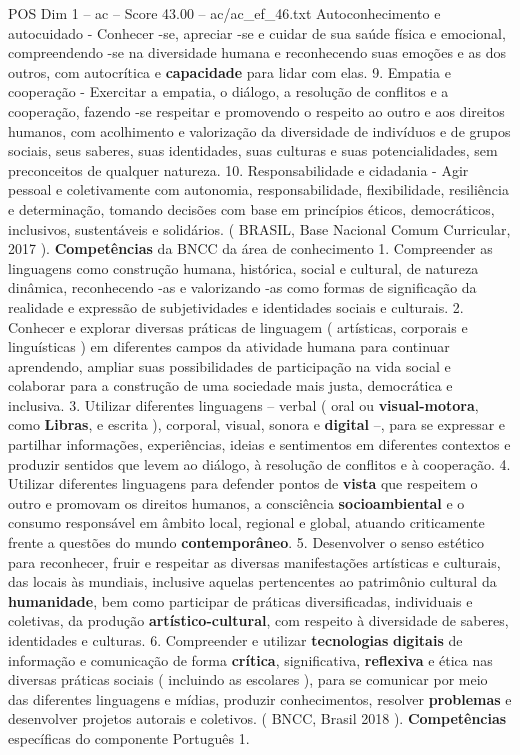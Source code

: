 \begin{textsample}{POS Dim 1 – ac – Score 43.00 – ac/ac\_ef\_46.txt}
Autoconhecimento e autocuidado - Conhecer -se, apreciar -se e cuidar de sua saúde física e emocional, compreendendo -se na diversidade humana e reconhecendo suas emoções e as dos outros, com autocrítica e \textbf{capacidade} para lidar com elas. 9.
Empatia e cooperação - Exercitar a empatia, o diálogo, a resolução de conflitos e a cooperação, fazendo -se respeitar e promovendo o respeito ao outro e aos direitos humanos, com acolhimento e valorização da diversidade de indivíduos e de grupos sociais, seus saberes, suas identidades, suas culturas e suas potencialidades, sem preconceitos de qualquer natureza. 10.
Responsabilidade e cidadania - Agir pessoal e coletivamente com autonomia, responsabilidade, flexibilidade, resiliência e determinação, tomando decisões com base em princípios éticos, democráticos, inclusivos, sustentáveis e solidários. ( BRASIL, Base Nacional Comum Curricular, 2017 ). \textbf{Competências} da BNCC da área de conhecimento 1.
Compreender as linguagens como construção humana, histórica, social e cultural, de natureza dinâmica, reconhecendo -as e valorizando -as como formas de significação da realidade e expressão de subjetividades e identidades sociais e culturais. 2.
Conhecer e explorar diversas práticas de linguagem ( artísticas, corporais e linguísticas ) em diferentes campos da atividade humana para continuar aprendendo, ampliar suas possibilidades de participação na vida social e colaborar para a construção de uma sociedade mais justa, democrática e inclusiva. 3.
Utilizar diferentes linguagens – verbal ( oral ou \textbf{visual-motora}, como \textbf{Libras}, e escrita ), corporal, visual, sonora e \textbf{digital} –, para se expressar e partilhar informações, experiências, ideias e sentimentos em diferentes contextos e produzir sentidos que levem ao diálogo, à resolução de conflitos e à cooperação. 4.
Utilizar diferentes linguagens para defender pontos de \textbf{vista} que respeitem o outro e promovam os direitos humanos, a consciência \textbf{socioambiental} e o consumo responsável em âmbito local, regional e global, atuando criticamente frente a questões do mundo \textbf{contemporâneo}. 5.
Desenvolver o senso estético para reconhecer, fruir e respeitar as diversas manifestações artísticas e culturais, das locais às mundiais, inclusive aquelas pertencentes ao patrimônio cultural da \textbf{humanidade}, bem como participar de práticas diversificadas, individuais e coletivas, da produção \textbf{artístico-cultural}, com respeito à diversidade de saberes, identidades e culturas. 6.
Compreender e utilizar \textbf{tecnologias} \textbf{digitais} de informação e comunicação de forma \textbf{crítica}, significativa, \textbf{reflexiva} e ética nas diversas práticas sociais ( incluindo as escolares ), para se comunicar por meio das diferentes linguagens e mídias, produzir conhecimentos, resolver \textbf{problemas} e desenvolver projetos autorais e coletivos. ( BNCC, Brasil 2018 ). \textbf{Competências} específicas do componente Português 1.

\end{textsample}
